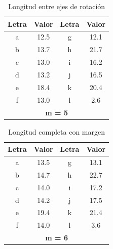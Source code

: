 \begin{multicols}{2}
  \begin{table}[H]
    \centering
    \caption{Longitud entre ejes de rotación}
    \begin{tabular}{cc|cc}
      \toprule
      \textbf{Letra} & \textbf{Valor} & \textbf{Letra} & \textbf{Valor} \\
      \midrule
      a & 12.5 & g & 12.1 \\
      b & 13.7 & h & 21.7 \\
      c & 13.0 & i & 16.2 \\
      d & 13.2 & j & 16.5 \\
      e & 18.4 & k & 20.4 \\
      f & 13.0 & l & 2.6 \\
      \multicolumn{4}{c}{\textbf{m = 5}} \\
      \bottomrule
    \end{tabular}
  \end{table}
  
  \begin{table}[H]
    \centering
    \caption{Longitud completa con margen}
    \begin{tabular}{cc|cc}
      \toprule
      \textbf{Letra} & \textbf{Valor} & \textbf{Letra} & \textbf{Valor} \\
      \midrule
      a & 13.5 & g & 13.1 \\
      b & 14.7 & h & 22.7 \\
      c & 14.0 & i & 17.2 \\
      d & 14.2 & j & 17.5 \\
      e & 19.4 & k & 21.4 \\
      f & 14.0 & l & 3.6 \\
      \multicolumn{4}{c}{\textbf{m = 6}} \\
      \bottomrule
    \end{tabular}
  \end{table}
\end{multicols}

